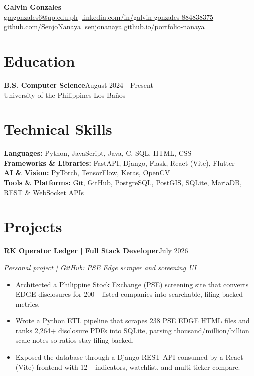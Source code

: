\documentclass[11pt,letterpaper]{article}
\newcommand{\entry}[2]{\par\vspace{4pt}\textbf{#1}\hfill #2\par}
\newcommand{\subentry}[1]{\textit{#1}\par}
\begin{document}
\raggedright

\begin{center}
  {\fontsize{20}{22}\selectfont\bfseries Galvin Gonzales}\\[2pt]
  {\small \href{mailto:gmgonzales6@up.edu.ph}{gmgonzales6@up.edu.ph} \enspace|\enspace \href{https://linkedin.com/in/galvin-gonzales-884838375}{\mbox{linkedin.com/in/galvin-gonzales-884838375}}}\\[1pt]
  {\small \href{https://github.com/SenjoNanaya}{\mbox{github.com/SenjoNanaya}} \enspace|\enspace \href{https://senjonanaya.github.io/portfolio-nanaya/}{\mbox{senjonanaya.github.io/portfolio-nanaya}}}
\end{center}

\section*{Education}
\textbf{B.S. Computer Science}\hfill August 2024 - Present\\
University of the Philippines Los Baños

\section*{Technical Skills}
\textbf{Languages:} Python, JavaScript, Java, C, SQL, HTML, CSS\\
\textbf{Frameworks \& Libraries:} FastAPI, Django, Flask, React (Vite), Flutter\\
\textbf{AI \& Vision:} PyTorch, TensorFlow, Keras, OpenCV\\
\textbf{Tools \& Platforms:} Git, GitHub, PostgreSQL, PostGIS, SQLite, MariaDB, REST \& WebSocket APIs

\section*{Projects}

\entry{RK Operator Ledger | Full Stack Developer}{July 2026}
\subentry{Personal project | \href{https://github.com/SenjoNanaya/pse-dividend-analysis}{GitHub: PSE Edge scraper and screening UI}}
\begin{itemize}
  \item Architected a Philippine Stock Exchange (PSE) screening site that converts EDGE disclosures for 200+ listed companies into searchable, filing-backed metrics.
  \item Wrote a Python ETL pipeline that scrapes 238 PSE EDGE HTML files and ranks 2,264+ disclosure PDFs into SQLite, parsing thousand/million/billion scale notes so ratios stay filing-backed.
  \item Exposed the database through a Django REST API consumed by a React (Vite) frontend with 12+ indicators, watchlist, and multi-ticker compare.
\end{itemize}
\end{document}
